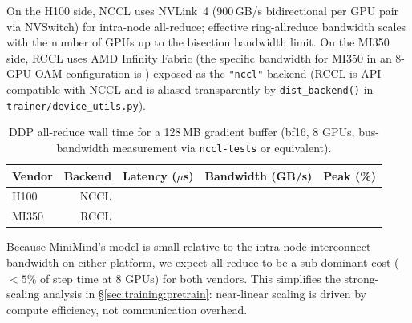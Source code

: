 On the H100 side, NCCL uses NVLink~4 (900\,GB/s bidirectional per GPU pair
via NVSwitch) for intra-node all-reduce; effective ring-allreduce bandwidth
scales with the number of GPUs up to the bisection bandwidth limit.  On the
MI350 side, RCCL uses AMD Infinity Fabric (the specific bandwidth for MI350
in an 8-GPU OAM configuration is \PH{}) exposed as the \texttt{"nccl"} backend
(RCCL is API-compatible with NCCL and is aliased transparently by
\texttt{dist\_backend()} in \texttt{trainer/device\_utils.py}).

\begin{table}[h]
\centering
\caption{DDP all-reduce wall time for a 128\,MB gradient buffer (bf16, 8 GPUs,
bus-bandwidth measurement via \texttt{nccl-tests} or equivalent).}
\label{tab:allreduce}
\small
\begin{tabular}{lrrrr}
\toprule
\textbf{Vendor} & \textbf{Backend} & \textbf{Latency ($\mu$s)} &
\textbf{Bandwidth (GB/s)} & \textbf{Peak (\%)} \\
\midrule
H100  & NCCL  & \PH{} & \PH{} & \PH{} \\
MI350 & RCCL  & \PH{} & \PH{} & \PH{} \\
\bottomrule
\end{tabular}
\end{table}

Because MiniMind's model is small relative to the intra-node interconnect
bandwidth on either platform, we expect all-reduce to be a sub-dominant
cost ($< 5\%$ of step time at 8 GPUs) for both vendors.  This simplifies
the strong-scaling analysis in \S\ref{sec:training:pretrain}: near-linear
scaling is driven by compute efficiency, not communication overhead.
